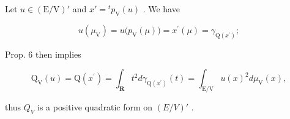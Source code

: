 Let \(u \in (\mathrm{E}/\mathrm{V})'\) and \(x' = {}^{t} p_{\mathrm{V}}(u)\) . We have

\[
u (\mu_ {\mathrm{V}}) = u \big (p _ {\mathrm{V}} (\mu) \big) = x ^ {\prime} (\mu) = \gamma_ {\mathrm{Q} (x ^ {\prime})};
\]

Prop. 6 then implies

\[
\mathrm{Q} _ {\mathrm{V}} (u) = \mathrm{Q} (x ^ {\prime}) = \int_ {\mathbf {R}} t ^ {2} d \gamma_ {\mathrm{Q} (x ^ {\prime})} (t) = \int_ {\mathrm{E} / \mathrm{V}} u (x) ^ {2} d \mu_ {\mathrm{V}} (x),
\]

thus \(Q_V\) is a positive quadratic form on \((E/V)'\) .

